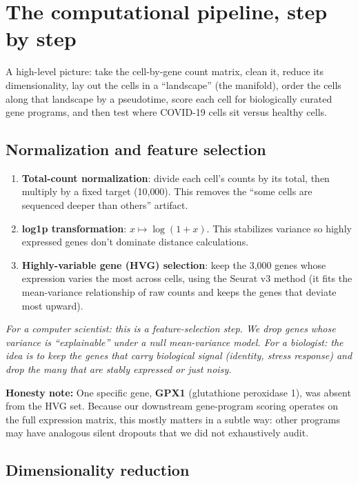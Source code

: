 \documentclass[11pt]{article}
\newcommand{\note}[1]{{\color{note}\textit{#1}}}
\newcommand{\honest}[1]{\textcolor{red!70!black}{\textbf{Honesty note:} #1}}
\begin{document}
\section{The computational pipeline, step by step}

A high-level picture: take the cell-by-gene count matrix, clean it, reduce its dimensionality, lay out the cells in a ``landscape'' (the manifold), order the cells along that landscape by a pseudotime, score each cell for biologically curated gene programs, and then test where COVID-19 cells sit versus healthy cells.

\subsection{Normalization and feature selection}

\begin{enumerate}
\item \textbf{Total-count normalization}: divide each cell's counts by its total, then multiply by a fixed target (10{,}000). This removes the ``some cells are sequenced deeper than others'' artifact.
\item \textbf{log1p transformation}: $x \mapsto \log(1+x)$. This stabilizes variance so highly expressed genes don't dominate distance calculations.
\item \textbf{Highly-variable gene (HVG) selection}: keep the 3{,}000 genes whose expression varies the most across cells, using the Seurat v3 method (it fits the mean-variance relationship of raw counts and keeps the genes that deviate most upward).
\end{enumerate}

\note{For a computer scientist: this is a feature-selection step. We drop genes whose variance is ``explainable'' under a null mean-variance model. For a biologist: the idea is to keep the genes that carry biological signal (identity, stress response) and drop the many that are stably expressed or just noisy.}

\honest{One specific gene, \textbf{GPX1} (glutathione peroxidase 1), was absent from the HVG set. Because our downstream gene-program scoring operates on the full expression matrix, this mostly matters in a subtle way: other programs may have analogous silent dropouts that we did not exhaustively audit.}

\subsection{Dimensionality reduction}
\end{document}
